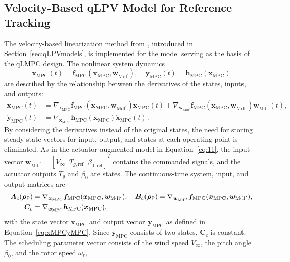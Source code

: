 \subsection{Velocity-Based qLPV Model for Reference Tracking}
The velocity-based linearization method from \cite{cisneros2020velocity}, introduced in Section~\ref{sec:qLPVmodels}, is implemented for the model serving as the basis of the qLMPC design. The nonlinear system dynamics
\[
\dot{\bm{x}}_{\text{MPC}}(t) = \bm{f}_{\text{MPC}}(\bm{x}_{\text{MPC}}, \bm{w}_{\text{Mdl}^\prime}), \quad \bm{y}_{\text{MPC}}(t) = \bm{h}_{\text{MPC}}(\bm{x}_{\text{MPC}})
\]
are described by the relationship between the derivatives of the states, inputs, and outputs:
\begin{align*}
    \ddot{\bm{x}}_{\text{MPC}}(t) &= \nabla_{\bm{x}_{\text{MPC}}} \bm{f}_{\text{MPC}}(\bm{x}_{\text{MPC}}, \bm{w}_{\text{Mdl}^\prime}) \dot{\bm{x}}_{\text{MPC}}(t) + \nabla_{\bm{w}_{\text{Mdl}^\prime}} \bm{f}_{\text{MPC}}(\bm{x}_{\text{MPC}}, \bm{w}_{\text{Mdl}^\prime}) \dot{\bm{w}}_{\text{Mdl}^\prime}(t),\\
    \dot{\bm{y}}_{\text{MPC}}(t) &= \nabla_{\bm{x}_{\text{MPC}}} \bm{h}_{\text{MPC}}(\bm{x}_{\text{MPC}}) \dot{\bm{x}}_{\text{MPC}}(t).
\end{align*}
By considering the derivatives instead of the original states, the need for storing steady-state vectors for input, output, and states at each operating point is eliminated.
As in the actuator-augmented model in Equation~\eqref{eq:11}, the input vector $\bm{w}_{\text{Mdl}^\prime} = [V_{\infty} \;\; T_{g,\text{ref}} \;\; \beta_{0,\text{ref}}]^T$ contains the commanded signals, and the actuator outputs $T_g$ and $\beta_0$ are states.
%
The continuous-time system, input, and output matrices are
\begin{align*}
    \bm{A}_c(\bm{\rho}_{\mathsf{P}}) &= \nabla_{\bm{x}_{\text{MPC}}} \bm{f}_{\text{MPC}}(\bm{x}_{\text{MPC}}, \bm{w}_{\text{Mdl}^\prime}),\quad
    \bm{B}_c(\bm{\rho}_{\mathsf{P}}) = \nabla_{\bm{w}_{\text{Mdl}^\prime}} \bm{f}_{\text{MPC}}(\bm{x}_{\text{MPC}}, \bm{w}_{\text{Mdl}^\prime}),\\
    \bm{C}_c &= \nabla_{\bm{x}_{\text{MPC}}} \bm{h}_{\text{MPC}}(\bm{x}_{\text{MPC}}),
\end{align*}
with the state vector $\bm{x}_{\text{MPC}}$ and output vector $\bm{y}_{\text{MPC}}$ as defined in Equation~\eqref{eq:xMPCyMPC}. Since $\bm{y}_{\text{MPC}}$ consists of two states, $\bm{C}_c$ is constant. The scheduling parameter vector consists of the wind speed $V_{\infty}$, the pitch angle $\beta_0$, and the rotor speed $\omega_r$,
